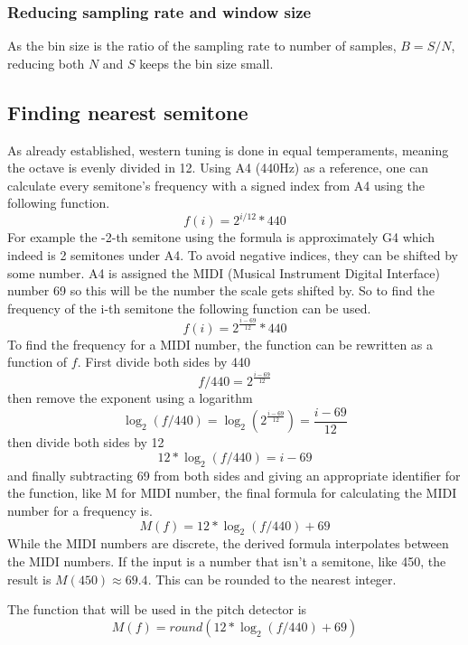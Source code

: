 \subsubsection{Reducing sampling rate and window size}
As the bin size is the ratio of the sampling rate to number of samples, $B = S/N$, reducing both $N$ and $S$ keeps the bin size small. 
\subsection{Finding nearest semitone}
As already established, western tuning is done in equal temperaments, meaning the octave is evenly divided in 12. Using A4 (440Hz) as a reference, one can calculate every semitone's frequency with a signed index from A4 using the following function. 
$$f(i) = 2^{i/12}*440$$
For example the -2-th semitone using the formula is approximately G4 which indeed is 2 semitones under A4. To avoid negative indices, they can be shifted by some number. A4 is assigned the MIDI (Musical Instrument Digital Interface) number 69 so this will be the number the scale gets shifted by. So to find the frequency of the i-th semitone the following function can be used.
$$f(i) = 2^{\frac{i-69}{12}}*440$$
To find the frequency for a MIDI number, the function can be rewritten as a function of $f$.
First divide both sides by 440
$$f/440 = 2^{\frac{i-69}{12}}$$
then remove the exponent using a logarithm
$$\log_2(f/440) = \log_2(2^{\frac{i-69}{12}}) = \frac{i-69}{12}$$
then divide both sides by 12
$$12*\log_2(f/440) = i-69$$
and finally subtracting 69 from both sides and giving an appropriate identifier for the function, like M for MIDI number, the final formula for calculating the MIDI number for a frequency is.
$$M(f) = 12*\log_2(f/440)+69$$
While the MIDI numbers are discrete, the derived formula interpolates between the MIDI numbers. If the input is a number that isn't a semitone, like 450, the result is $M(450) \approx 69.4$. This can be rounded to the nearest integer.

The function that will be used in the pitch detector is
$$M(f) = round(12*\log_2(f/440)+69)$$

